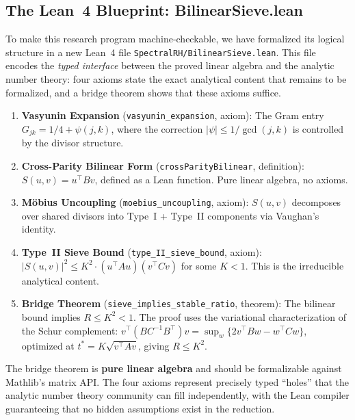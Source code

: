 \documentclass[11pt,a4paper]{article}
\theoremstyle{definition}
\theoremstyle{remark}
\newcommand{\lean}[1]{\texttt{#1}}
\begin{document}
\subsection{The Lean~4 Blueprint: BilinearSieve.lean}

To make this research program machine-checkable, we have formalized
its logical structure in a new Lean~4 file
\texttt{SpectralRH/BilinearSieve.lean}. This file encodes the
\emph{typed interface} between the proved linear algebra and the
analytic number theory: four axioms state the exact analytical
content that remains to be formalized, and a bridge theorem
shows that these axioms suffice.

\begin{enumerate}
  \item \textbf{Vasyunin Expansion} (\lean{vasyunin\_expansion}, axiom):
    The Gram entry $G_{jk} = 1/4 + \psi(j,k)$, where the correction
    $|\psi| \leq 1/\gcd(j,k)$ is controlled by the divisor structure.

  \item \textbf{Cross-Parity Bilinear Form}
    (\lean{crossParityBilinear}, definition):
    $S(u,v) = u^\top B v$, defined as a Lean function.
    Pure linear algebra, no axioms.

  \item \textbf{M\"obius Uncoupling} (\lean{moebius\_uncoupling}, axiom):
    $S(u,v)$ decomposes over shared divisors into Type~I + Type~II
    components via Vaughan's identity.

  \item \textbf{Type~II Sieve Bound}
    (\lean{type\_II\_sieve\_bound}, axiom):
    $|S(u,v)|^2 \leq K^2 \cdot (u^\top A u)(v^\top C v)$
    for some $K < 1$. This is the irreducible analytical content.

  \item \textbf{Bridge Theorem}
    (\lean{sieve\_implies\_stable\_ratio}, theorem):
    The bilinear bound implies $R \leq K^2 < 1$. The proof uses
    the variational characterization of the Schur complement:
    $v^\top(BC^{-1}B^\top)v = \sup_w \{2v^\top Bw - w^\top Cw\}$,
    optimized at $t^* = K\sqrt{v^\top Av}$, giving $R \leq K^2$.
\end{enumerate}

\noindent The bridge theorem is \textbf{pure linear algebra} and
should be formalizable against Mathlib's matrix API. The four
axioms represent precisely typed ``holes'' that the analytic number
theory community can fill independently, with the Lean compiler
guaranteeing that no hidden assumptions exist in the reduction.
\end{document}
